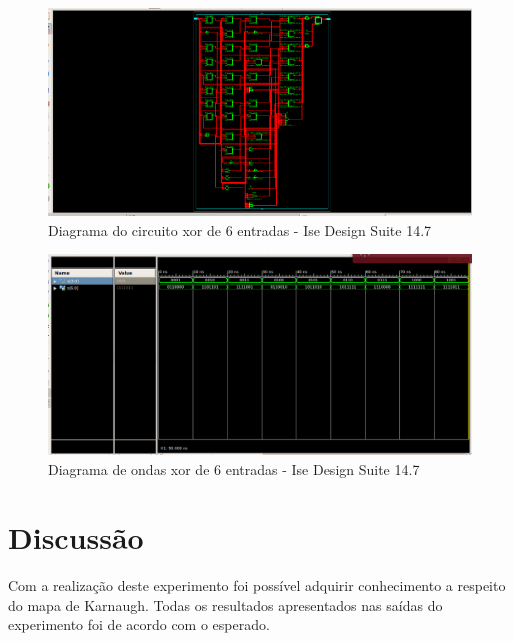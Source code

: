 \documentclass[12pts]{article}
\begin{document}
\begin{figure}[!htb]
  \centering
  \includegraphics[scale=0.6]{imagens/circuito}
  \caption{Diagrama do circuito xor de 6 entradas - Ise Design Suite 14.7}	
  \label{figRotulo}
\end{figure}

\begin{figure}[!htb]
  \centering

  \includegraphics[scale=0.4]{imagens/onda}
  \caption{Diagrama de ondas xor de 6 entradas - Ise Design Suite 14.7}
  \label{figRotulo}
\end{figure}
\newpage

\section{Discussão}

Com a realização deste experimento foi possível adquirir conhecimento a respeito do mapa de Karnaugh. Todas os resultados apresentados nas saídas do experimento foi de acordo com o esperado.
\end{document}
